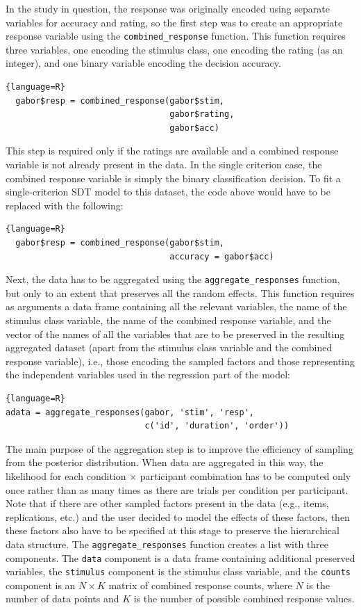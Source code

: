 \documentclass[a4paper,man,apacite,floatsintext]{apa6}
\newcommand{\code}[1]{\texttt{#1}}
\begin{document}
In the study in question, the response was originally encoded using
separate variables for accuracy and rating, so the first step was to
create an appropriate response variable using the
\code{combined\_response} function. This function requires three
variables, one encoding the stimulus class, one encoding the rating
(as an integer), and one binary variable encoding the decision
accuracy.

\begin{lstlisting}{language=R}
  gabor$resp = combined_response(gabor$stim, 
                                 gabor$rating, 
                                 gabor$acc)
\end{lstlisting}

This step is required only if the ratings are available and a combined
response variable is not already present in the data. In the single
criterion case, the combined response variable is simply the binary
classification decision. To fit a single-criterion SDT model to this
dataset, the code above would have to be replaced with the following:

\begin{lstlisting}{language=R}
  gabor$resp = combined_response(gabor$stim, 
                                 accuracy = gabor$acc)
\end{lstlisting}

Next, the data has to be aggregated using the
\code{aggregate\_responses} function, but only to an extent that
preserves all the random effects. This function requires as arguments
a data frame containing all the relevant variables, the name of the
stimulus class variable, the name of the combined response variable,
and the vector of the names of all the variables that are to be
preserved in the resulting aggregated dataset (apart from the stimulus
class variable and the combined response variable), i.e., those
encoding the sampled factors and those representing the independent
variables used in the regression part of the model:

\begin{lstlisting}{language=R}
adata = aggregate_responses(gabor, 'stim', 'resp', 
                            c('id', 'duration', 'order'))  
\end{lstlisting}

The main purpose of the aggregation step is to improve the efficiency
of sampling from the posterior distribution. When data are aggregated
in this way, the likelihood for each condition $\times$ participant
combination has to be computed only once rather than as many times as
there are trials per condition per participant. Note that if there are
other sampled factors present in the data (e.g., items, replications,
etc.) and the user decided to model the effects of these factors, then
these factors also have to be specified at this stage to preserve the
hierarchical data structure. The \code{aggregate\_responses} function
creates a list with three components. The \code{data} component is a
data frame containing additional preserved variables, the
\code{stimulus} component is the stimulus class variable, and the
\code{counts} component is an $N\times K$ matrix of combined response
counts, where $N$ is the number of data points and $K$ is the number
of possible combined response values.
\end{document}
